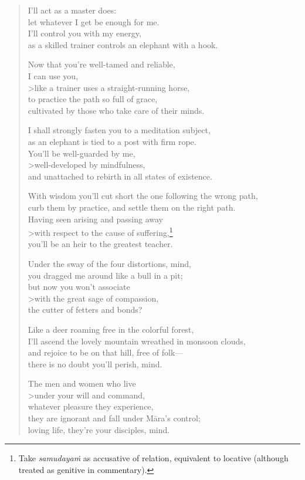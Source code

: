 \documentclass[12pt,openany]{book}%
\begin{document}
\begin{verse}
I’ll act as a master does: \\
let whatever I get be enough for me. \\
I’ll control you with my energy, \\
as a skilled trainer controls an elephant with a hook. 

Now that you’re well-tamed and reliable, \\
I can use you, \\>like a trainer uses a straight-running horse, \\
to practice the path so full of grace, \\
cultivated by those who take care of their minds. 

I shall strongly fasten you to a meditation subject, \\
as an elephant is tied to a post with firm rope. \\
You’ll be well-guarded by me, \\>well-developed by mindfulness, \\
and unattached to rebirth in all states of existence. 

With wisdom you’ll cut short the one following the wrong path, \\
curb them by practice, and settle them on the right path. \\
Having seen arising and passing away \\>with respect to the cause of suffering,\footnote{Take \textit{\textsanskrit{samudayaṁ}} as accusative of relation, equivalent to locative (although treated as genitive in commentary). } \\
you’ll be an heir to the greatest teacher. 

Under the sway of the four distortions, mind, \\
you dragged me around like a bull in a pit; \\
but now you won’t associate \\>with the great sage of compassion, \\
the cutter of fetters and bonds? 

Like a deer roaming free in the colorful forest, \\
I’ll ascend the lovely mountain wreathed in monsoon clouds, \\
and rejoice to be on that hill, free of folk—\\
there is no doubt you’ll perish, mind. 

The men and women who live \\>under your will and command, \\
whatever pleasure they experience, \\
they are ignorant and fall under \textsanskrit{Māra}’s control; \\
loving life, they’re your disciples, mind. 

%
\end{verse}
\end{document}
